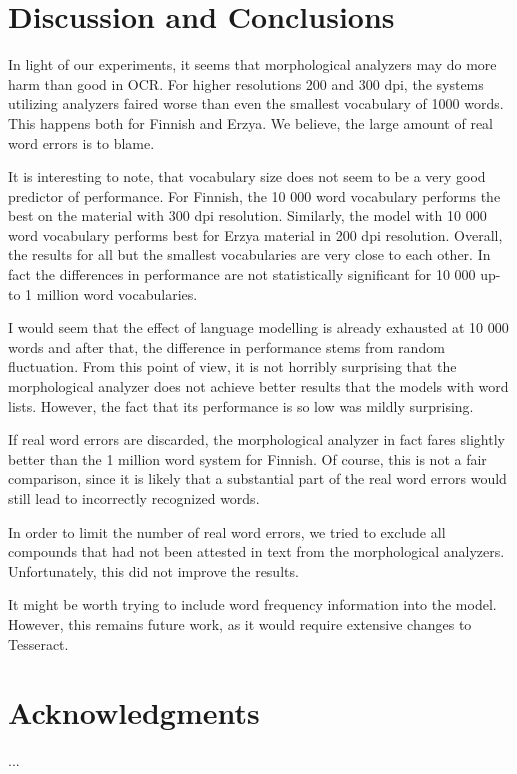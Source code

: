 \documentclass[b5paper]{article}
\begin{document}
\section{Discussion and Conclusions}
\label{disc}

In light of our experiments, it seems that morphological analyzers may
do more harm than good in OCR. For higher resolutions 200 and 300 dpi,
the systems utilizing analyzers faired worse than even the smallest
vocabulary of 1000 words. This happens both for Finnish and Erzya. We
believe, the large amount of real word errors is to blame.

It is interesting to note, that vocabulary size does not seem to be a
very good predictor of performance. For Finnish, the 10 000 word
vocabulary performs the best on the material with 300 dpi
resolution. Similarly, the model with 10 000 word vocabulary performs
best for Erzya material in 200 dpi resolution. Overall, the results
for all but the smallest vocabularies are very close to each other. In
fact the differences in performance are not statistically significant
for 10 000 up-to 1 million word vocabularies.

I would seem that the effect of language modelling is already
exhausted at 10 000 words and after that, the difference in
performance stems from random fluctuation. From this point of view, it
is not horribly surprising that the morphological analyzer does not
achieve better results that the models with word lists. However, the
fact that its performance is so low was mildly surprising.

If real word errors are discarded, the morphological analyzer in fact
fares slightly better than the 1 million word system for Finnish. Of
course, this is not a fair comparison, since it is likely that a
substantial part of the real word errors would still lead to
incorrectly recognized words.

In order to limit the number of real word errors, we tried to exclude
all compounds that had not been attested in text from the
morphological analyzers. Unfortunately, this did not improve the
results.

It might be worth trying to include word frequency information into
the model. However, this remains future work, as it would require
extensive changes to Tesseract.

\section*{Acknowledgments}

...



\end{document}
